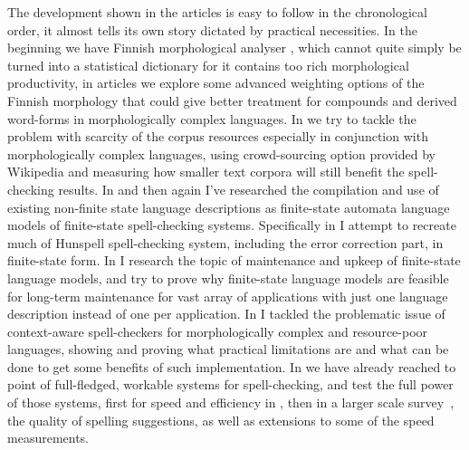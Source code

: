 \documentclass[officiallayout]{unihelcompling}
\begin{document}
The development shown in the articles is easy to follow in the chronological
order, it almost tells its own story dictated by practical necessities. In the
beginning we have Finnish morphological analyser \citep{pirinen2008suomen},
which cannot quite simply be turned into a statistical dictionary for it
contains too rich morphological productivity, in articles
 we explore some advanced
weighting options of the Finnish morphology that could give better treatment
for compounds and derived word-forms in morphologically complex languages. In
 we try to tackle the problem with scarcity
of the corpus resources especially in conjunction with morphologically complex
languages, using crowd-sourcing option provided by Wikipedia and measuring how
smaller text corpora will still benefit the spell-checking results. In
 and then again
 I've researched the compilation and use of
existing non-finite state language descriptions as finite-state automata
language models of finite-state spell-checking systems. Specifically in
 I attempt to recreate much of Hunspell
spell-checking system, including the error correction part, in finite-state
form. In  I research the topic of
maintenance and upkeep of finite-state language models, and try to prove why
finite-state language models are feasible for long-term maintenance for vast
array of applications with just one language description instead of one per
application.  In  I tackled the problematic
issue of context-aware spell-checkers for morphologically complex and
resource-poor languages, showing and proving what practical limitations are and
what can be done to get some benefits of such implementation. In
 we have already reached to
point of full-fledged, workable systems for spell-checking, and test the full
power of those systems, first for speed and efficiency in
, then in a larger scale
survey~, the quality of spelling suggestions, as
well as extensions to some of the speed measurements.
\end{document}

